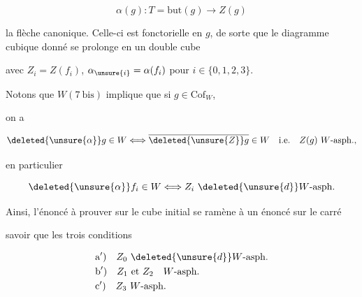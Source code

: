 \[
\alpha(g):T=\mathrm{but}(g)\longrightarrow Z(g)
\]

la flèche canonique. Celle-ci est fonctorielle en $g$, de sorte que le diagramme cubique donné se prolonge en un double cube


avec  $Z_i=Z(f_i)$, $\alpha_{\unsure{i}}=\alpha(f_i)$ pour $i\in\{0,1,2,3\}$.

Notons que $W(7\ \mathrm{bis})$ implique que si $g\in\mathrm{Cof}_W$,

on a

\[
\deleted{\unsure{\alpha}}g\in W\Longleftrightarrow\overline{\deleted{\unsure{Z}}g}\in W\quad\text{i.e.}\quad Z(g)\ W\text{-asph.},
\]

en particulier

\[
\deleted{\unsure{\alpha}}f_i\in W\Longleftrightarrow Z_i\ \deleted{\unsure{d}}W\text{-asph.}
\]

Ainsi, l'énoncé à prouver sur le cube initial se ramène à  un énoncé  sur le carré


savoir que les trois conditions

\[
\begin{aligned}
&\text{a}')\quad Z_0\ \deleted{\unsure{d}}W\text{-asph.}\\
&\text{b}')\quad Z_1\text{ et }Z_2\quad W\text{-asph.}\\
&\text{c}')\quad Z_3\ W\text{-asph.}
\end{aligned}
\]

